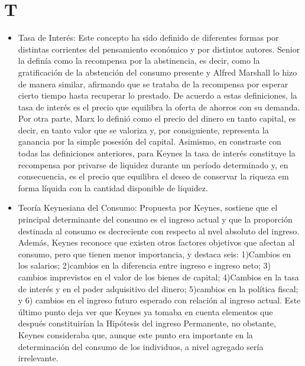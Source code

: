 \documentclass{article}
\begin{document}
\section{T}
\begin{itemize}

\item Tasa de Interés: Este concepto ha sido definido de diferentes formas por distintas corrientes del pensamiento económico y por distintos autores. Senior la definía como la recompensa por la abstinencia, es decir, como la gratificación de la abstención del consumo presente y Alfred Marshall lo hizo de manera similar, afirmando que se trataba de la recompensa por esperar cierto tiempo hasta recuperar lo prestado. De acuerdo a estas definiciones, la tasa de interés es el precio que equilibra la oferta de ahorros con su demanda. Por otra parte, Marx lo definió como el precio del dinero en tanto capital, es decir, en tanto valor que se valoriza y, por consiguiente, representa la ganancia por la simple posesión del capital. Asimismo, en constraste con todas las definiciones anteriores, para Keynes la tasa de interés constituye la recompensa por privarse de liquidez durante un período determinado y, en consecuencia, es el precio que equilibra el deseo de conservar la riqueza em forma líquida con la cantidad disponible de liquidez. 

\item Teoría Keynesiana del Consumo: Propuesta por Keynes, sostiene que el principal determinante del consumo es el ingreso actual y que la proporción destinada al consumo es decreciente con respecto al nvel absoluto del ingreso. Además, Keynes reconoce que existen otros factores objetivos que afectan al consumo, pero que tienen menor importancia, y destaca seis: 1)Cambios en los salarios; 2)cambios en la diferencia entre ingreso e ingreso neto; 3) cambios imprevistos en el valor de los bienes de capital; 4)Cambios en la tasa de interés y en el poder adquisitivo del dinero; 5)cambios en la política fiscal; y 6) cambios en el ingreso futuro esperado con relación al ingreso actual. Este último punto deja ver que Keynes ya tomaba en cuenta elementos que después constituirían la Hipótesis del ingreso Permanente, no obstante, Keynes consideraba que, aunque este punto era importante en la determinación del consumo de los individuos, a nivel agregado sería irrelevante. 

\end{itemize}
\end{document}

